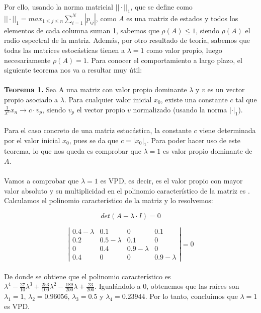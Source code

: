 \documentclass[10pt,a4paper]{article}
\begin{document}
Por ello, usando la norma matricial $|| \cdot ||_1$, que se define como $|| \cdot ||_1 = max_{1 \leq j \leq n} \sum_{i = 1}^{N} |p_{ij}|$, como $A$ es una matriz de estados y todos los elementos de cada columna suman 1, sabemos que $\rho (A) \leq 1$, siendo $\rho(A)$ el radio espectral de la matriz. Además, por otro resultado de teoria, sabemos que todas las matrices estocásticas tienen a $\lambda = 1$ como valor propio, luego necesariamente $\rho(A) = 1$. Para conocer el comportamiento a largo plazo, el siguiente teorema nos va a resultar muy útil:
\\
\\
\textbf{Teorema 1.} Sea A una matriz con valor propio dominante $\lambda$ y $v$ es un vector propio asociado a $\lambda$. Para cualquier valor inicial $x_0$, existe una constante $c$ tal que $\frac{1}{\lambda ^n} x_n \rightarrow c \cdot v_p$, siendo $v_p$ el vector propio $v$ normalizado (usando la norma $|\cdot|_1$). \\
\\
Para el caso concreto de una matriz estocástica, la constante $c$ viene determinada por el valor inicial $x_0$, pues se da que $c = | x_0 |_1$. Para poder hacer uso de este teorema, lo que nos queda es comprobar que $\lambda = 1$ es valor propio dominante de $A$.
\\
\\
Vamos a comprobar que $\lambda = 1$ es VPD, es decir, es el valor propio con mayor valor absoluto y su multiplicidad en el polinomio  característico de la matriz es . Calculamos el polinomio característico de la matriz y lo resolvemos:

\[
det(A - \lambda \cdot I) = 0
\]

\[
\left |
\begin{array}{cccc}

0.4 - \lambda & 0.1 & 0 & 0.1 \\

0.2 & 0.5 - \lambda & 0.1 & 0 \\

0 & 0.4 & 0.9 - \lambda & 0 \\

0.4 & 0 & 0 & 0.9 - \lambda

\end{array}
\right | 
= 0
\]
\\
De donde se obtiene que el polinomio característico es $\lambda ^ 4 - \frac{27}{10} \lambda ^ 3 + \frac{253}{100} \lambda ^ 2 - \frac{189}{200} \lambda + \frac{23}{200}$. Igualándolo a 0, obtenemos que las raíces son $\lambda_1 = 1$, $\lambda_2 = 0.96056$, $\lambda_3 = 0.5$ y $\lambda_4 = 0.23944$. Por lo tanto, concluimos que $\lambda = 1$ es VPD. \\
\end{document}

